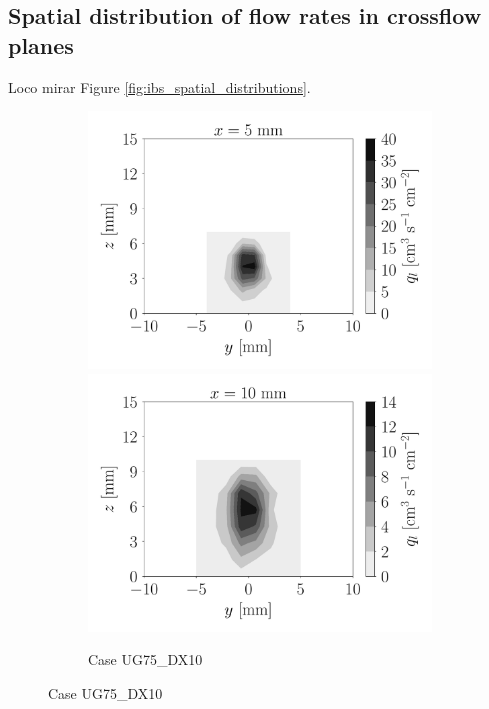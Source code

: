 \clearpage


\subsection{Spatial distribution of flow rates in crossflow planes}

Loco mirar Figure \ref{fig:ibs_spatial_distributions}.

\begin{figure}[ht]
\flushleft
\begin{subfigure}[b]{1.1\textwidth}
	\flushleft
   \includegraphics[scale=0.225]{./part2_developments/figures_ch5_resolved_JICF/flow_rates_ibs/spatial_maps/UG75_DX10_x05mm_volume_flux}
   \includegraphics[scale=0.225]{./part2_developments/figures_ch5_resolved_JICF/flow_rates_ibs/spatial_maps/UG75_DX10_x10mm_volume_flux}
   \vspace*{-0.1in}
	\caption{Case UG75\_DX10}
\end{subfigure}



\end{figure}
